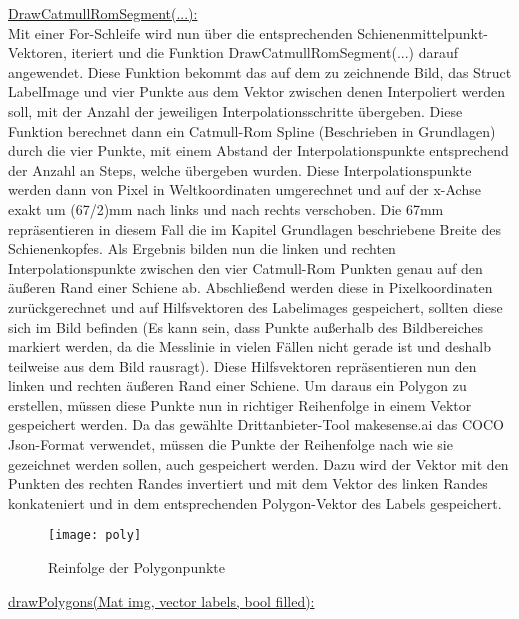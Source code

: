 \noindent
\underline{DrawCatmullRomSegment(...):}
\\

\noindent
 Mit einer For-Schleife wird nun über die entsprechenden Schienenmittelpunkt-Vektoren, iteriert und die Funktion DrawCatmullRomSegment(...) darauf angewendet. Diese Funktion bekommt das auf dem zu zeichnende Bild, das Struct LabelImage und vier Punkte aus dem Vektor zwischen denen Interpoliert werden soll, mit der Anzahl der jeweiligen Interpolationsschritte übergeben. Diese Funktion berechnet dann ein Catmull-Rom Spline (Beschrieben in Grundlagen) durch die vier Punkte, mit einem Abstand der Interpolationspunkte entsprechend der Anzahl an Steps, welche übergeben wurden. Diese Interpolationspunkte werden dann von Pixel in Weltkoordinaten umgerechnet und auf der x-Achse exakt um (67/2)mm nach links und nach rechts verschoben. Die 67mm repräsentieren in diesem Fall die im Kapitel Grundlagen beschriebene Breite des Schienenkopfes. Als Ergebnis bilden nun die linken und rechten Interpolationspunkte zwischen den vier Catmull-Rom Punkten genau auf den äußeren Rand einer Schiene ab. Abschließend werden diese in Pixelkoordinaten zurückgerechnet und auf Hilfsvektoren des Labelimages gespeichert, sollten diese sich im Bild befinden (Es kann sein, dass Punkte außerhalb des Bildbereiches markiert werden, da die Messlinie in vielen Fällen nicht gerade ist und deshalb teilweise aus dem Bild rausragt). 
Diese Hilfsvektoren repräsentieren nun den linken und rechten äußeren Rand einer Schiene. Um daraus ein Polygon zu erstellen, müssen diese Punkte nun in richtiger Reihenfolge in einem Vektor gespeichert werden. Da das gewählte Drittanbieter-Tool makesense.ai das COCO Json-Format verwendet, müssen die Punkte der Reihenfolge nach wie sie gezeichnet werden sollen, auch gespeichert werden. Dazu wird der Vektor mit den Punkten des rechten Randes invertiert und mit dem Vektor des linken Randes konkateniert und in dem entsprechenden Polygon-Vektor des Labels gespeichert.
\begin{figure}[H]
\centering
  \texttt{[image: poly]}
  \caption{Reinfolge der Polygonpunkte}
\end{figure}


\noindent
\underline{drawPolygons(Mat img, vector labels, bool filled):}
\\

